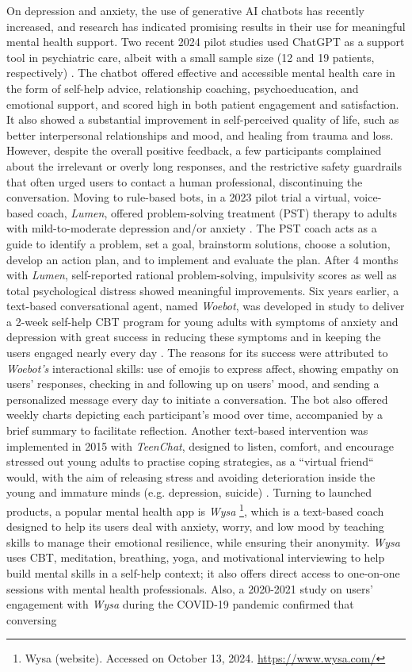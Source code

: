 On depression and anxiety, the use of generative AI chatbots has recently increased, and research has indicated promising results in their use for meaningful mental health support. Two recent 2024 pilot studies used ChatGPT as a support tool in psychiatric care, albeit with a small sample size (12 and 19 patients, respectively) \cite{melo2024chatgpt, siddals2024}. The chatbot offered effective and accessible mental health care in the form of self-help advice, relationship coaching, psychoeducation, and emotional support, and scored high in both patient engagement and satisfaction. It also showed a substantial improvement in self-perceived quality of life, such as better interpersonal relationships and mood, and healing from trauma and loss. However, despite the overall positive feedback, a few participants complained about the irrelevant or overly long responses, and the restrictive safety guardrails that often urged users to contact a human professional, discontinuing the conversation. Moving to rule-based bots, in a 2023 pilot trial a virtual, voice-based coach, \textit{Lumen}, offered problem-solving treatment (PST) therapy to adults with mild-to-moderate depression and/or anxiety \cite{depressioncoach2023}. The PST coach acts as a guide to identify a problem, set a goal, brainstorm solutions, choose a solution, develop an action plan, and to implement and evaluate the plan. After 4 months with \textit{Lumen}, self-reported rational problem-solving, impulsivity scores as well as total psychological distress showed meaningful improvements. Six years earlier, a text-based conversational agent, named \textit{Woebot}, was developed in study to deliver a 2-week self-help CBT program for young adults with symptoms of anxiety and depression with great success in reducing these symptoms and in keeping the users engaged nearly every day \cite{woebot2017}. The reasons for its success were attributed to \textit{Woebot's} interactional skills: use of emojis to express affect, showing empathy on users' responses, checking in and following up on users' mood, and sending a personalized message every day to initiate a conversation. The bot also offered weekly charts depicting each participant’s mood over time, accompanied by a brief summary to facilitate reflection. Another text-based intervention was implemented in 2015 with \textit{TeenChat}, designed to listen, comfort, and encourage stressed out young adults to practise coping strategies, as a ``virtual friend`` would, with the aim of releasing stress and avoiding deterioration inside the young and immature minds (e.g. depression, suicide) \cite{TeenChat2015}. Turning to launched products, a popular mental health app is \textit{Wysa} \footnote{Wysa (website). Accessed on October 13, 2024. \url{https://www.wysa.com/}}, which is a text-based coach designed to help its users deal with anxiety, worry, and low mood by teaching skills to manage their emotional resilience, while ensuring their anonymity. \textit{Wysa} uses CBT, meditation, breathing, yoga, and motivational interviewing to help build mental skills in a self-help context; it also offers direct access to one-on-one sessions with mental health professionals. Also, a 2020-2021 study on users' engagement with \textit{Wysa} during the COVID-19 pandemic confirmed that conversing 